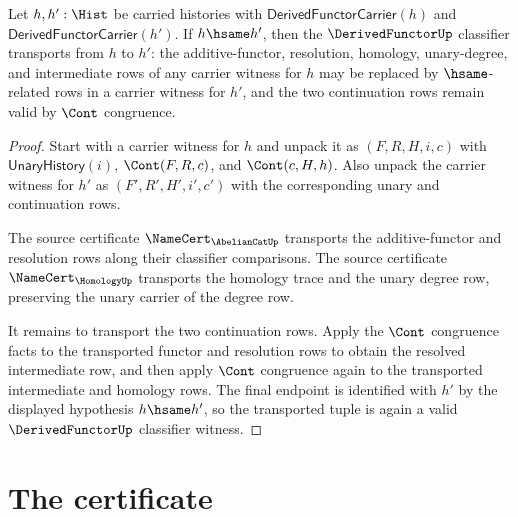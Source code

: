 \begin{theorem}\label{thm:derivedfunctor-classifier-stability}
Let $h,h':\Hist$ be carried histories with $\mathsf{DerivedFunctorCarrier}(h)$ and $\mathsf{DerivedFunctorCarrier}(h')$. If $h\hsame h'$, then the $\DerivedFunctorUp$ classifier transports from $h$ to $h'$: the additive-functor, resolution, homology, unary-degree, and intermediate rows of any carrier witness for $h$ may be replaced by $\hsame$-related rows in a carrier witness for $h'$, and the two continuation rows remain valid by $\Cont$ congruence.
\end{theorem}
\begin{proof}
Start with a carrier witness for $h$ and unpack it as $(F,R,H,i,c)$ with $\mathsf{UnaryHistory}(i)$, $\Cont(F,R,c)$, and $\Cont(c,H,h)$. Also unpack the carrier witness for $h'$ as $(F',R',H',i',c')$ with the corresponding unary and continuation rows.

The source certificate $\NameCert_{\AbelianCatUp}$ transports the additive-functor and resolution rows along their classifier comparisons. The source certificate $\NameCert_{\HomologyUp}$ transports the homology trace and the unary degree row, preserving the unary carrier of the degree row.

It remains to transport the two continuation rows. Apply the $\Cont$ congruence facts to the transported functor and resolution rows to obtain the resolved intermediate row, and then apply $\Cont$ congruence again to the transported intermediate and homology rows. The final endpoint is identified with $h'$ by the displayed hypothesis $h\hsame h'$, so the transported tuple is again a valid $\DerivedFunctorUp$ classifier witness.
\end{proof}

\section{The certificate}
\label{sec:derivedfunctor-certificate}

